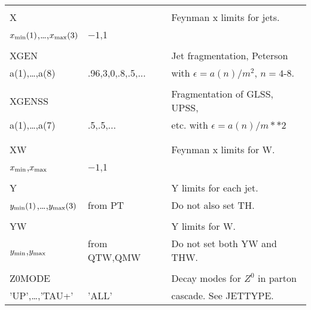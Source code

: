 \begin{center}
\begin{tabular}{lll}
                       &                   &                                \\
X                      &                   & Feynman x limits for jets.     \\
$x_{\rm min}(1)$,\dots,$x_{\rm max}(3)$ & 
$-1$,1                                     &                                \\
                       &                   &                                \\
XGEN                   &                   & Jet fragmentation, Peterson    \\
a(1),\dots,a(8)        & .96,3,0,.8,.5,... & with $\epsilon=a(n)/m^2$, 
$n=4$-8.                                                                    \\
                       &                   &                                \\
XGENSS                 &                   & Fragmentation of GLSS, UPSS,   \\
a(1),\dots,a(7)        & .5,.5,...         & etc. with $\epsilon=a(n)/m**2$ \\
                       &                   &                                \\
                       &                   &                                \\
XW                     &                   & Feynman x limits for W.        \\
$x_{\rm min}$,$x_{\rm max}$ & $-1$,1       &                                \\
                       &                   &                                \\
Y                      &                   & Y limits for each jet.         \\
$y_{\rm min}(1)$,\dots,$y_{\rm max}(3)$ & from PT & Do not also set TH.     \\
                       &                   &                                \\
YW                     &                   & Y limits for W.                \\
$y_{\rm min}$,$y_{\rm max}$ & from QTW,QMW & Do not set both YW and THW.    \\
                       &                   &                                \\
Z0MODE                 &                   & Decay modes for $Z^0$ in parton\\
'UP',\dots,'TAU+'      & 'ALL'             & cascade. See JETTYPE.          \\
\hline\hline
\end{tabular}
\end{center}

